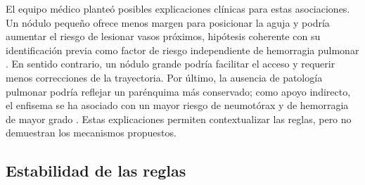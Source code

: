 El equipo médico planteó posibles explicaciones clínicas para estas asociaciones. Un nódulo pequeño ofrece menos margen para posicionar la aguja y podría aumentar el riesgo de lesionar vasos próximos, hipótesis coherente con su identificación previa como factor de riesgo independiente de hemorragia pulmonar \cite{Zhu2020}. En sentido contrario, un nódulo grande podría facilitar el acceso y requerir menos correcciones de la trayectoria. Por último, la ausencia de patología pulmonar podría reflejar un parénquima más conservado; como apoyo indirecto, el enfisema se ha asociado con un mayor riesgo de neumotórax y de hemorragia de mayor grado \cite{Zhao2017}. Estas explicaciones permiten contextualizar las reglas, pero no demuestran los mecanismos propuestos.


\subsection{Estabilidad de las reglas}



